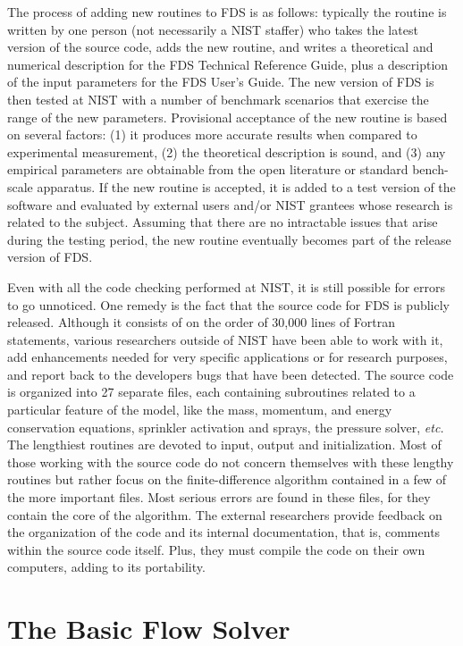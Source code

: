 \documentclass[11pt]{book}
\begin{document}
The process of adding new routines to FDS is as follows: typically the routine is written by one person (not necessarily a NIST staffer) who takes
the latest version of the source code, adds the new routine, and writes a theoretical and numerical description for the FDS Technical Reference
Guide, plus a description of the input parameters for the FDS User's Guide. The new version of FDS is then tested at NIST with a number of benchmark
scenarios that exercise the range of the new parameters.  Provisional acceptance of the new routine is based on several factors: (1) it produces more
accurate results when compared to experimental measurement, (2) the theoretical description is sound, and (3) any empirical parameters are obtainable
from the open literature or standard bench-scale apparatus.  If the new routine is accepted, it is added to a test version of the software and
evaluated by external users and/or NIST grantees whose research is related to the subject. Assuming that there are no intractable issues that arise
during the testing period, the new routine eventually becomes part of the release version of FDS.

Even with all the code checking performed at NIST, it is still possible for errors to go unnoticed. One remedy is the fact that the source code for
FDS is publicly released. Although it consists of on the order of 30,000 lines of Fortran statements, various researchers outside of NIST have been
able to work with it, add enhancements needed for very specific applications or for research purposes, and report back to the developers bugs that
have been detected. The source code is organized into 27 separate files, each containing subroutines related to a particular feature of the model,
like the mass, momentum, and energy conservation equations, sprinkler activation and sprays, the pressure solver, {\em etc.} The lengthiest routines
are devoted to input, output and initialization.  Most of those working with the source code do not concern themselves with these lengthy routines
but rather focus on the finite-difference algorithm contained in a few of the more important files. Most serious errors are found in these files, for
they contain the core of the algorithm. The external researchers provide feedback on the organization of the code and its internal documentation,
that is, comments within the source code itself.  Plus, they must compile the code on their own computers, adding to its portability.



\chapter{The Basic Flow Solver}
\end{document}
